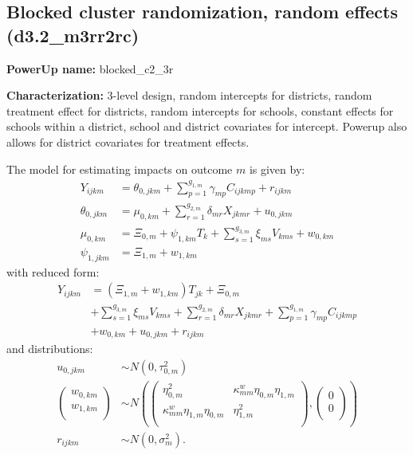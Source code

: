 \documentclass[12pt]{article}
\begin{document}
\newpage
\subsection{Blocked cluster randomization, random effects (d3.2\_m3rr2rc)}

\textbf{PowerUp name:} blocked\_c2\_3r

\textbf{Characterization:} 3-level design, random intercepts for districts, random treatment effect for districts, random intercepts for schools, constant effects for schools within a district, school and district covariates for intercept. Powerup also allows for district covariates for treatment effects.

The model for estimating impacts on outcome $m$ is given by:
\begin{align}
Y_{ijkm} &=  \theta_{0,jkm} + \sum_{p=1}^{g_{1,m}} \gamma_{mp} C_{ijkmp} + r_{ijkm}\\
\nonumber \theta_{0,jkm} &= \mu_{0,km} + \sum_{r=1}^{g_{2,m}} \delta_{mr} X_{jkmr} + u_{0,jkm}\\
\nonumber \mu_{0,km}  &= \Xi_{0,m} + \psi_{1,km} T_{k} + \sum_{s=1}^{g_{3,m}} \xi_{ms} V_{kms} + w_{0,km} \\
\nonumber \psi_{1,jkm} &= \Xi_{1,m} + w_{1,km}
\end{align}
with reduced form:
\begin{align}
Y_{ijkm} &= \left(\Xi_{1,m} + w_{1,km}\right) T_{jk} + \Xi_{0,m}\\
\nonumber & + \sum_{s=1}^{g_{3,m}} \xi_{ms} V_{kms} + \sum_{r=1}^{g_{2,m}} \delta_{mr} X_{jkmr} + \sum_{p=1}^{g_{1,m}} \gamma_{mp} C_{ijkmp}\\
\nonumber &+ w_{0,km} + u_{0,jkm} + r_{ijkm}
\end{align}
and distributions:
\begin{align}
u_{0,jkm} &\sim N\left(0, \tau^2_{0,m}\right)\\
\nonumber \begin{pmatrix} w_{0, km} \\ w_{1,km}\\ \end{pmatrix} &\sim
N\left(\begin{pmatrix} \eta^2_{0,m} & \kappa^w_{mm} \eta_{0,m} \eta_{1,m} \\ \kappa^w_{mm} \eta_{1,m} \eta_{0,m} & \eta^2_{1,m} \\ \end{pmatrix}, \begin{pmatrix} 0 \\ 0\\ \end{pmatrix}\right) \\
\nonumber r_{ijkm} &\sim N\left(0, \sigma^2_m\right).
\end{align}
\end{document}
